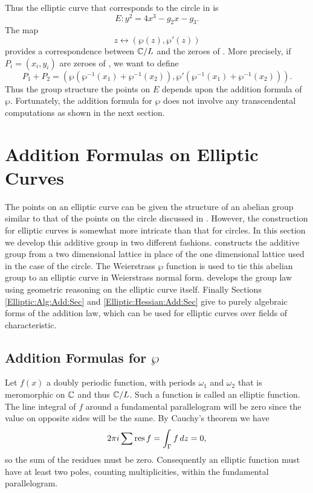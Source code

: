 Thus  the elliptic curve that corresponds to the circle in
 is
\begin {equation}\label{Ell:Weier:form:Eq}
E : y^2 = 4x^3 - g_2 x - g_3.
\end{equation}
The map
\[
z \longleftrightarrow (\wp(z), \wp'(z))
\]
provides a correspondence between $\mathbb{C}/L$ and the zeroes of
.  More precisely, if $P_i = (x_i, y_i)$ are
zeroes of , we want to define 
\[
P_1 + P_2 = ( \wp(\wp^{-1}(x_1) + \wp^{-1}(x_2)), 
\wp'(\wp^{-1}(x_1) + \wp^{-1}(x_2))).
\]
Thus the group structure the points on $E$ depends upon the addition
formula of $\wp$.  Fortunately, the addition formula for $\wp$ does
not involve any transcendental computations as shown in the next section.

\section{Addition Formulas on Elliptic Curves}
\label{Elliptic:Addition:Sec}

The points on an elliptic curve can be given the structure of an
abelian group similar to that of the points on the circle discussed in
.  However, the construction for elliptic
curves is somewhat more intricate than that for circles.  In this
section we develop this additive group in two different fashions.  
 constructs the additive group from a two
dimensional lattice in place of the one dimensional lattice used in
the case of the circle.  The Weierstrass $\wp$ function is used to tie
this abelian group to an elliptic curve in Weierstrass normal form. 
 develops the group law using geometric
reasoning on the elliptic curve itself.  Finally Sections
\ref{Elliptic:Alg:Add:Sec} and \ref{Elliptic:Hessian:Add:Sec} give to
purely algebraic forms of the addition law, which can be used for
elliptic curves over fields of characteristic.

\subsection{Addition Formulas for $\wp$}
\label{Elliptic:WP:Add:Sec}

Let $f(x)$ a doubly periodic function, with periods $\omega_1$ and
$\omega_2$ that is meromorphic on $\mathbb{C}$ and thus $\mathbb{C}/L$.  Such a
function is called an elliptic function.  The line integral of $f$
around a fundamental parallelogram will be zero since the value on
opposite sides will be the same.  By Cauchy's theorem we have
\[
2 \pi i \sum \mathop{\rm res}\nolimits f = \int_\Gamma f\,dz = 0,
\]
so the sum of the residues must be zero.  Consequently an elliptic
function must have at least two poles, counting multiplicities, within
the fundamental parallelogram.


